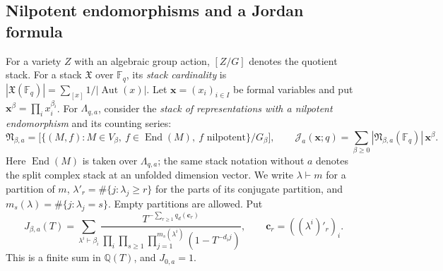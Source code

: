 \documentclass[11pt, reqno]{amsart}
\numberwithin{equation}{section}
\theoremstyle{definition}
\theoremstyle{remark}
\newcommand{\op}[1]{\operatorname{#1}}
\newcommand{\mb}[1]{\mathbb{#1}}
\newcommand{\mc}[1]{\mathcal{#1}}
\newcommand{\End}{\op{End}}
\newcommand{\Aut}{\op{Aut}}
\begin{document}
\subsection{Nilpotent endomorphisms and a Jordan formula}

For a variety $Z$ with an algebraic group action, $[Z/G]$ denotes
the quotient stack. For a stack $\mathfrak X$ over $\mb F_q$,
its \emph{stack cardinality} is
$|\mathfrak X(\mb F_q)|=\sum_{[x]}1/|\Aut(x)|$.
Let $\mathbf x=(x_i)_{i\in I}$ be formal variables and put
$\mathbf x^\beta=\prod_i x_i^{\beta_i}$. For $\Lambda_{q,a}$,
consider the \emph{stack of representations with a nilpotent
endomorphism} and its counting series:
\[ \mathfrak N_{\beta,a} =\bigl[\{(M,f):M\in V_\beta,\ f\in\End(M),\ f\text{ nilpotent}\}/G_\beta\bigr], \qquad \mc J_a(\mathbf x;q) =\sum_{\beta\geq0}|\mathfrak N_{\beta,a}(\mb F_q)|\,\mathbf x^\beta. \]
Here $\End(M)$ is taken over $\Lambda_{q,a}$; the same stack
notation without $a$ denotes the split complex stack at an unfolded
dimension vector.
We write $\lambda\vdash m$ for a partition of $m$,
$\lambda'_r=\#\{j:\lambda_j\geq r\}$ for the parts of its
conjugate partition, and $m_s(\lambda)=\#\{j:\lambda_j=s\}$.
Empty partitions are allowed. Put
\begin{equation}\label{eq:jordan-coefficient} J_{\beta,a}(T)= \sum_{\lambda^i\vdash\beta_i} \frac{T^{-\sum_{r\geq1}q_d(\mathbf c_r)}} {\displaystyle\prod_i\prod_{s\geq1} \prod_{j=1}^{m_s(\lambda^i)}(1-T^{-d_i j})}, \qquad \mathbf c_r=((\lambda^i)'_r)_i.\end{equation}
This is a finite sum in $\mb Q(T)$, and $J_{0,a}=1$.
\end{document}
